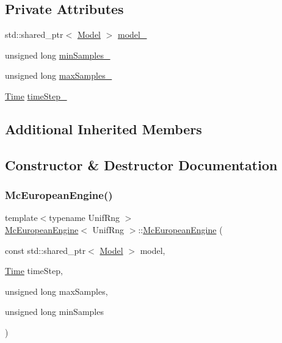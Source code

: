 \subsection*{Private Attributes}
\begin{DoxyCompactItemize}
\item 
std\+::shared\+\_\+ptr$<$ \hyperlink{class_model}{Model} $>$ \hyperlink{class_mc_european_engine_ac9a776838f0c894f04c64491a6a0e931}{model\+\_\+}
\item 
unsigned long \hyperlink{class_mc_european_engine_ab0811b021427b14b9e63afe57cf66f46}{min\+Samples\+\_\+}
\item 
unsigned long \hyperlink{class_mc_european_engine_ae6c942f2c6f52c461663968f8b5f9161}{max\+Samples\+\_\+}
\item 
\hyperlink{_name_def_8h_ac2d3e0ba793497bcca555c7c2cf64ff3}{Time} \hyperlink{class_mc_european_engine_a6cf4932a9ca4b0c8bd6d3f4a1a23367e}{time\+Step\+\_\+}
\end{DoxyCompactItemize}
\subsection*{Additional Inherited Members}


\subsection{Constructor \& Destructor Documentation}
\hypertarget{class_mc_european_engine_ae43a5aacc327f15f33e63e3c505ec324}{}\label{class_mc_european_engine_ae43a5aacc327f15f33e63e3c505ec324} 
\subsubsection{\texorpdfstring{Mc\+European\+Engine()}{McEuropeanEngine()}}
{\footnotesize\ttfamily template$<$typename Unif\+Rng $>$ \\
\hyperlink{class_mc_european_engine}{Mc\+European\+Engine}$<$ Unif\+Rng $>$\+::\hyperlink{class_mc_european_engine}{Mc\+European\+Engine} (\begin{DoxyParamCaption}\item[{const std\+::shared\+\_\+ptr$<$ \hyperlink{class_model}{Model} $>$}]{model,  }\item[{\hyperlink{_name_def_8h_ac2d3e0ba793497bcca555c7c2cf64ff3}{Time}}]{time\+Step,  }\item[{unsigned long}]{max\+Samples,  }\item[{unsigned long}]{min\+Samples }\end{DoxyParamCaption})}




